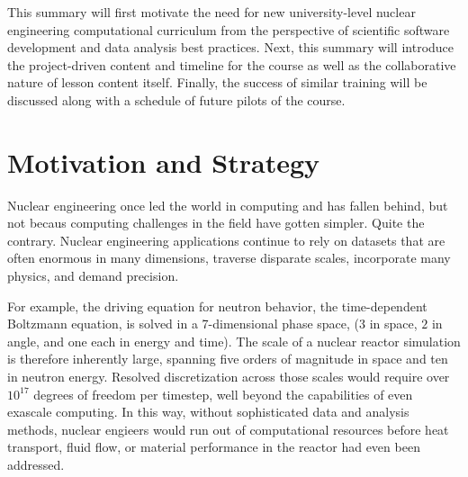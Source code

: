 \documentclass{anstrans}
\begin{document}
This summary will first motivate the need for new university-level nuclear
engineering  computational curriculum  from the perspective of  scientific
software development and data analysis best practices.  Next, this summary will
introduce the project-driven content and timeline for the course as well as the
collaborative nature of lesson content itself. Finally, the success of
similar training will be discussed along with a schedule of future pilots of
the course.

\section{Motivation and Strategy}





Nuclear engineering once led the world in computing and has fallen behind, but
not becaus computing challenges in the field have gotten simpler. Quite the 
contrary. Nuclear engineering applications continue to rely on datasets that 
are often enormous in many dimensions, traverse disparate scales, incorporate 
many physics, and demand precision.

For example, the driving equation for neutron behavior, the time-dependent
Boltzmann equation, is solved in a 7-dimensional phase space, ($3$ in space, $2$
in angle, and one each in energy and time). The scale of a nuclear reactor
simulation is therefore inherently large, spanning five orders of magnitude in space and
ten in neutron energy. Resolved discretization across those scales would require
over $10^{17}$ degrees of freedom per timestep, well beyond the
capabilities of even exascale computing. In this way, without sophisticated
data and analysis methods, nuclear engieers would run out of computational resources before
heat transport, fluid flow, or material performance in the reactor had even
been addressed.
\end{document}
